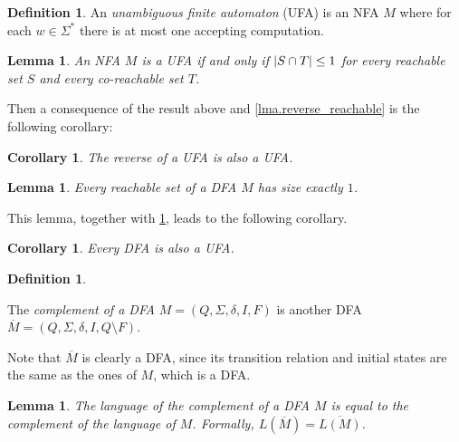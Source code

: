 \documentclass{report}
\DeclarePairedDelimiter{\abs}{\lvert}{\rvert}
\newtheorem{lemma}[theorem]{Lemma}
\newtheorem{corollary}[theorem]{Corollary}
\theoremstyle{definition}
\newtheorem{definition}[theorem]{Definition}
\begin{document}
\begin{definition} \label{def.UFA}
An \emph{unambiguous finite automaton} (UFA) is an NFA $M$ where for
each $w \in \Sigma^{\ast}$ there is at most one accepting computation.
\end{definition}

\begin{lemma} \label{lma.UFA_characterization}
An NFA $M$ is a UFA if and only if $\abs{S \cap T} \leq 1$ for every reachable
set $S$ and every co-reachable set $T$.
\end{lemma}

Then a consequence of the result above and \cref{lma.reverse_reachable} is the
following corollary:

\begin{corollary} \label{crl.reverse_UFA}
The reverse of a UFA is also a UFA.
\end{corollary}

\begin{lemma} \label{lma.DFA_reachable}
Every reachable set of a DFA $M$ has size exactly $1$.
\end{lemma}

This lemma, together with \cref{lma.UFA_characterization},
leads to the following corollary.

\begin{corollary} \label{crl.DFA_is_UFA}
Every DFA is also a UFA.
\end{corollary}

\begin{definition} \label{def.complement_DFA}
\begin{sloppypar}
The \emph{complement of a DFA} $M = (Q, \Sigma, \delta, I, F)$ is another DFA
${\overline{M} = (Q, \Sigma, \delta, I, Q \setminus F)}$.
\end{sloppypar}

Note that $\overline{M}$ is clearly a DFA, since its transition relation and
initial states are the same as the ones of $M$, which is a DFA.
\end{definition}

\begin{lemma} \label{lma.of_complement_is_complement}
The language of the complement of a DFA $M$ is equal to the complement of the
language of $M$. Formally, $L(\overline{M}) = \overline{L(M)}$.
\end{lemma}
\end{document}
